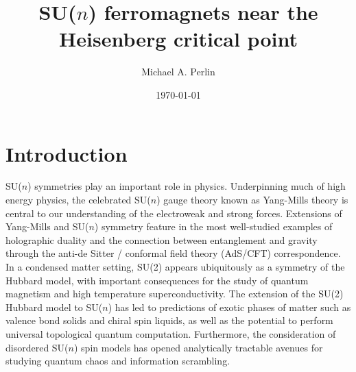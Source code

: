 \documentclass[nofootinbib,notitlepage,11pt]{revtex4-2}
\newcommand{\1}{\mathds{1}}
\begin{document}

\title{SU($n$) ferromagnets near the Heisenberg critical point}%
\author{Michael A. Perlin}%
\date{\today}

\maketitle

\tableofcontents

\section{Introduction}

SU($n$) symmetries play an important role in physics.  Underpinning
much of high energy physics, the celebrated SU($n$) gauge theory known
as Yang-Mills theory is central to our understanding of the
electroweak and strong forces.  Extensions of Yang-Mills and SU($n$)
symmetry feature in the most well-studied examples of holographic
duality\cite{maldacena1999largen} and the connection between
entanglement and gravity\cite{ryu2006holographic} through the anti-de
Sitter / conformal field theory (AdS/CFT) correspondence.  In a
condensed matter setting, SU(2) appears ubiquitously as a symmetry of
the Hubbard model, with important consequences for the study of
quantum magnetism and high temperature
superconductivity\cite{lee2006doping}.  The extension of the SU(2)
Hubbard model to SU($n$) has led to predictions of exotic phases of
matter such as valence bond solids\cite{read1989valencebond,
  rokhsar1990quadratic, kaul2012lattice, hermele2011topological} and
chiral spin liquids\cite{hermele2009mott, hermele2011topological,
  chen2016syntheticgaugefield, nataf2016chiral}, as well as the
potential to perform universal topological quantum
computation\cite{freedman2004class, nayak2008nonabelian}.
Furthermore, the consideration of disordered SU($n$) spin models has
opened analytically tractable avenues for studying quantum chaos and
information scrambling\cite{sachdev1993gapless,
  bentsen2019integrable}.
\end{document}
